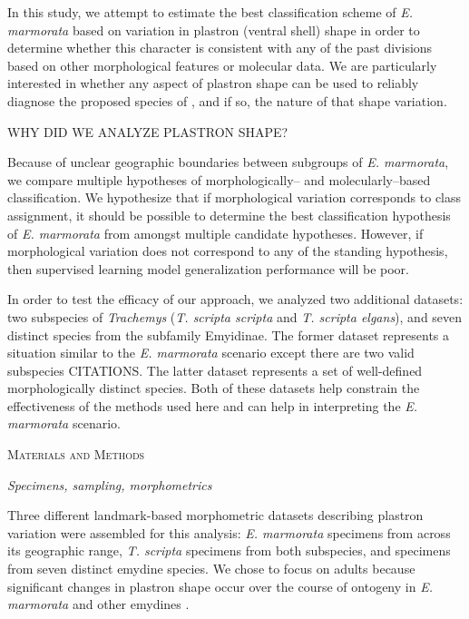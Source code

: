 \documentclass[12pt,letterpaper]{article}
\renewcommand{\section}[1]{%
\bigskip
\begin{center}
\begin{Large}
\normalfont\scshape #1
\medskip
\end{Large}
\end{center}}
\renewcommand{\subsection}[1]{%
\bigskip
\begin{center}
\begin{large}
\normalfont\itshape #1
\end{large}
\end{center}}
\begin{document}
In this study, we attempt to estimate the best classification scheme of \textit{E. marmorata} based on variation in plastron (ventral shell) shape in order to determine whether this character is consistent with any of the past divisions based on other morphological features or molecular data. We are particularly interested in whether any aspect of plastron shape can be used to reliably diagnose the proposed species of \citet{Spinks2014}, and if so, the nature of that shape variation.

\uppercase{Why did we analyze plastron shape?}

Because of unclear geographic boundaries between subgroups of \textit{E. marmorata}, we compare multiple hypotheses of morphologically-- and molecularly--based classification. We hypothesize that if morphological variation corresponds to class assignment, it should be possible to determine the best classification hypothesis of \textit{E. marmorata} from amongst multiple candidate hypotheses. However, if morphological variation does not correspond to any of the standing hypothesis, then supervised learning model generalization performance will be poor.

In order to test the efficacy of our approach, we analyzed two additional datasets: two subspecies of \textit{Trachemys} (\textit{T. scripta scripta} and \textit{T. scripta elgans}), and seven distinct species from the subfamily Emyidinae. The former dataset represents a situation similar to the \textit{E. marmorata} scenario except there are two valid subspecies CITATIONS. The latter dataset represents a set of well-defined morphologically distinct species. Both of these datasets help constrain the effectiveness of the methods used here and can help in interpreting the \textit{E. marmorata} scenario.


\section{Materials and Methods}
\subsection{Specimens, sampling, morphometrics}
Three different landmark-based morphometric datasets describing plastron variation were assembled for this analysis: \textit{E. marmorata} specimens from across its geographic range, \textit{T. scripta} specimens from both subspecies, and specimens from seven distinct emydine species. We chose to focus on adults because significant changes in plastron shape occur over the course of ontogeny in \textit{E. marmorata} and other emydines \citep{Angielczyk2013a}.
\end{document}

